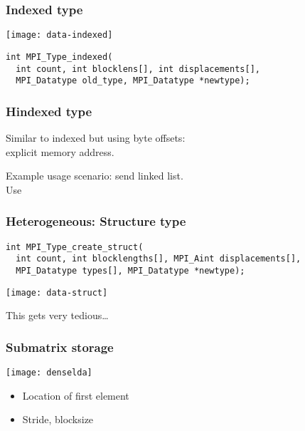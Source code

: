 \begin{exerciseframe}[stridesend]
  
\end{exerciseframe}

\begin{longcourse}
  \begin{exerciseframe}
    
  \end{exerciseframe}
\end{longcourse}

\begin{frame}[containsverbatim]\frametitle{Indexed type}
  \texttt{[image: data-indexed]}
\begin{lstlisting}
int MPI_Type_indexed(
  int count, int blocklens[], int displacements[],
  MPI_Datatype old_type, MPI_Datatype *newtype);
\end{lstlisting}
\end{frame}

\begin{frame}[containsverbatim]\frametitle{Hindexed type}
  Similar to indexed but using byte offsets:\\
  explicit memory address.

  Example usage scenario: send linked list.\\
  Use 
\end{frame}

\begin{frame}[containsverbatim]\frametitle{Heterogeneous: Structure type}
\begin{lstlisting}
int MPI_Type_create_struct(
  int count, int blocklengths[], MPI_Aint displacements[],
  MPI_Datatype types[], MPI_Datatype *newtype);
\end{lstlisting}
  \texttt{[image: data-struct]}

This gets very tedious\ldots
\end{frame}


\begin{frame}[containsverbatim]\frametitle{Submatrix storage}
  \texttt{[image: denselda]}

  \begin{itemize}
  \item Location of first element
  \item Stride, blocksize
  \end{itemize}
\end{frame}

